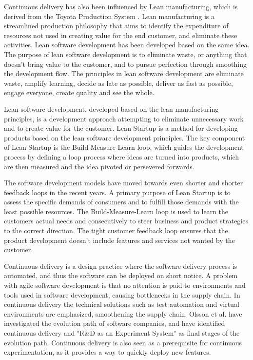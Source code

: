 \documentclass[english]{tktltiki2}
\theoremstyle{definition}
\theoremstyle{remark}
\begin{document}
Continuous delivery has also been influenced by Lean manufacturing, which is derived from the Toyota Production System \cite{ono1988toyota}. Lean manufacturing is a streamlined production philosophy that aims to identify the expenditure of resources not used in creating value for the end customer, and eliminate these activities. Lean software development \cite{poppendieck2003lean} has been developed based on the same idea. The purpose of lean software development is to eliminate waste, or anything that doesn't bring value to the customer, and to pursue perfection through smoothing the development flow. The principles in lean software development are eliminate waste, amplify learning, decide as late as possible, deliver as fast as possible, engage everyone, create quality and see the whole. 

Lean software development, developed based on the lean manufacturing principles, is a development approach attempting to eliminate unnecessary work and to create value for the customer. Lean Startup \cite{ries2011lean} is a method for developing products based on the lean software development principles. The key component of Lean Startup is the Build-Measure-Learn loop, which guides the development process by defining a loop process where ideas are turned into products, which are then measured and the idea pivoted or persevered forwards.

The software development models have moved towards even shorter and shorter feedback loops in the recent years. A primary purpose of Lean Startup is to assess the specific demands of consumers and to fulfill those demands with the least possible resources. The Build-Measure-Learn loop is used to learn the customers actual needs and consecutively to steer business and product strategies to the correct direction. The tight customer feedback loop ensures that the product development doesn't include features and services not wanted by the customer. 

Continuous delivery is a design practice where the software delivery process is automated, and thus the software can be deployed on short notice. A problem with agile software development is that no attention is paid to environments and tools used in software development, causing bottlenecks in the supply chain. In continuous delivery the technical solutions such as test automation and virtual environments are emphasized, smoothening the supply chain. Olsson et al. have investigated the evolution path of software companies, and have identified continuous delivery and "R\&D as an Experiment System" as final stages \cite{olsson2012climbing} of the evolution path. Continuous delivery is also seen as a prerequisite for continuous experimentation, as it provides a way to quickly deploy new features. 
\end{document}

